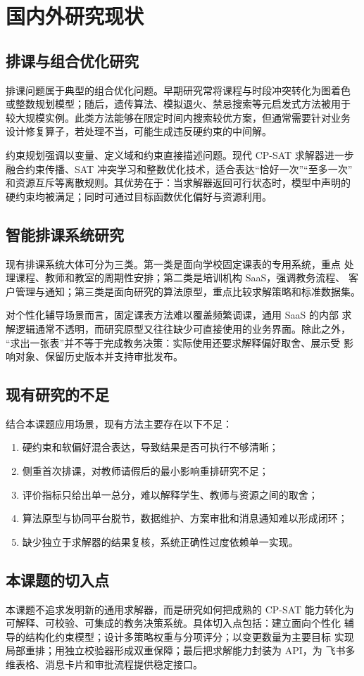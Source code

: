 \clearpage
\section{国内外研究现状}

\subsection{排课与组合优化研究}

排课问题属于典型的组合优化问题。早期研究常将课程与时段冲突转化为图着色
或整数规划模型；随后，遗传算法、模拟退火、禁忌搜索等元启发式方法被用于
较大规模实例。此类方法能够在限定时间内搜索较优方案，但通常需要针对业务
设计修复算子，若处理不当，可能生成违反硬约束的中间解。

约束规划强调以变量、定义域和约束直接描述问题。现代 CP-SAT 求解器进一步
融合约束传播、SAT 冲突学习和整数优化技术，适合表达“恰好一次”“至多一次”
和资源互斥等离散规则。其优势在于：当求解器返回可行状态时，模型中声明的
硬约束均被满足；同时可通过目标函数优化偏好与资源利用。

\subsection{智能排课系统研究}

现有排课系统大体可分为三类。第一类是面向学校固定课表的专用系统，重点
处理课程、教师和教室的周期性安排；第二类是培训机构 SaaS，强调教务流程、
客户管理与通知；第三类是面向研究的算法原型，重点比较求解策略和标准数据集。

对个性化辅导场景而言，固定课表方法难以覆盖频繁调课，通用 SaaS 的内部
求解逻辑通常不透明，而研究原型又往往缺少可直接使用的业务界面。除此之外，
“求出一张表”并不等于完成教务决策：实际使用还要求解释偏好取舍、展示受
影响对象、保留历史版本并支持审批发布。

\subsection{现有研究的不足}

结合本课题应用场景，现有方法主要存在以下不足：

\begin{enumerate}
  \item 硬约束和软偏好混合表达，导致结果是否可执行不够清晰；
  \item 侧重首次排课，对教师请假后的最小影响重排研究不足；
  \item 评价指标只给出单一总分，难以解释学生、教师与资源之间的取舍；
  \item 算法原型与协同平台脱节，数据维护、方案审批和消息通知难以形成闭环；
  \item 缺少独立于求解器的结果复核，系统正确性过度依赖单一实现。
\end{enumerate}

\subsection{本课题的切入点}

本课题不追求发明新的通用求解器，而是研究如何把成熟的 CP-SAT 能力转化为
可解释、可校验、可集成的教务决策系统。具体切入点包括：建立面向个性化
辅导的结构化约束模型；设计多策略权重与分项评分；以变更数量为主要目标
实现局部重排；用独立校验器形成双重保障；最后把求解能力封装为 API，为
飞书多维表格、消息卡片和审批流程提供稳定接口。
